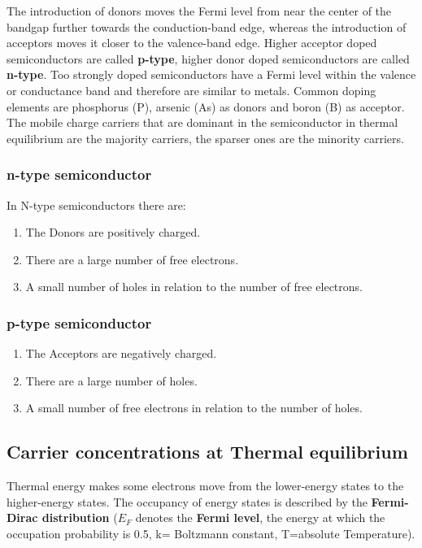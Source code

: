 \documentclass[main]{subfiles}
\begin{document}
The introduction of donors moves the Fermi level from near the center of the bandgap further towards the conduction-band edge, whereas the
introduction of acceptors moves it closer to the valence-band edge. Higher acceptor doped semiconductors are called \textbf{p-type}, higher donor doped semiconductors are called \textbf{n-type}. Too strongly doped semiconductors have a Fermi level within the valence or conductance band and therefore are similar to metals. Common doping elements are phosphorus (P), arsenic (As) as donors and boron (B) as acceptor.\\
The mobile charge carriers that are dominant in the semiconductor in thermal equilibrium are the majority carriers, the sparser ones are the minority carriers.

\subsubsection{n-type semiconductor}
In N-type semiconductors there are:

\begin{enumerate}
\item The Donors are positively charged.
\item There are a large number of free electrons.
\item A small number of holes in relation to the number of free electrons.
\end{enumerate}

\subsubsection{p-type semiconductor}
\begin{enumerate}
\item The Acceptors are negatively charged.
\item There are a large number of holes.
\item A small number of free electrons in relation to the number of holes.
\end{enumerate}

\subsection{Carrier concentrations at Thermal equilibrium}
Thermal energy makes some electrons move from the lower-energy states to the higher-energy states. The occupancy of energy states is described by the \textbf{Fermi-Dirac distribution} (\(E_F\) denotes the \textbf{Fermi level}, the energy at which the occupation probability is 0.5, k= Boltzmann constant, T=absolute Temperature).
\end{document}
